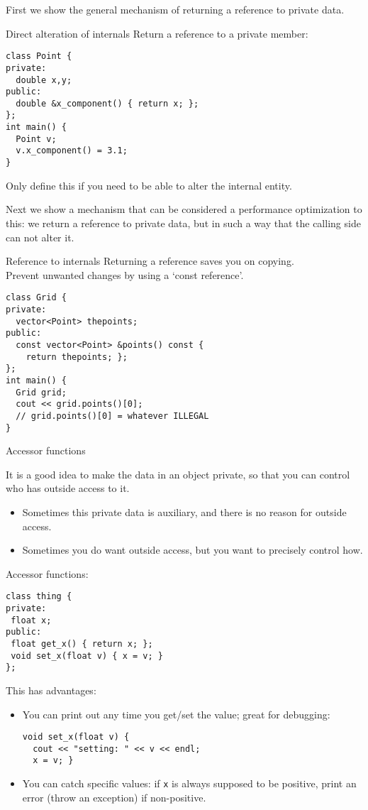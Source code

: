 First we show the general mechanism of returning
a reference to private data.

\begin{block}{Direct alteration of internals}
  \label{sl:obj-return-ref}
  Return a reference to a private member:
  \lstset{style=snippetcode}
\begin{lstlisting}
class Point {
private:
  double x,y;
public:
  double &x_component() { return x; };
};
int main() {
  Point v;
  v.x_component() = 3.1;
}
\end{lstlisting}
Only define this if you need to be able to alter the internal entity.
\end{block}

Next we show a mechanism that can be considered a performance optimization
to this: we return a reference to private data, but in such a way
that the calling side can not alter it.

\begin{block}{Reference to internals}
  \label{sl:obj-return-const-ref}
  Returning a reference saves you on copying.\\
  Prevent unwanted changes by using a `const reference'.
  \lstset{style=snippetcode}
\begin{lstlisting}
class Grid {
private:
  vector<Point> thepoints;
public:
  const vector<Point> &points() const {
    return thepoints; };
};
int main() {
  Grid grid;
  cout << grid.points()[0];
  // grid.points()[0] = whatever ILLEGAL
}
\end{lstlisting}
\end{block}

 {Accessor functions}
\label{sec:cpp-accessor}

It is a good idea to make the data in an object private,
so that you can control who has outside access to it.
\begin{itemize}
\item Sometimes this private data is auxiliary, and there is no reason
  for outside access.
\item Sometimes you do want outside access, but you want to precisely
  control how.
\end{itemize}

Accessor functions:
\begin{lstlisting}
class thing {
private:
 float x;
public:
 float get_x() { return x; };
 void set_x(float v) { x = v; }
};
\end{lstlisting}
This has advantages:
\begin{itemize}
\item You can print out any time you get/set the value; great for
  debugging:
\begin{lstlisting}
void set_x(float v) {
  cout << "setting: " << v << endl;
  x = v; }
\end{lstlisting}
\item You can catch specific values: if \lstinline{x} is always supposed to be
  positive, print an error (throw an exception) if non-positive.
\end{itemize}

